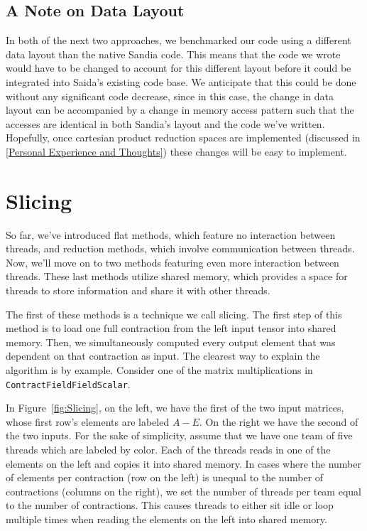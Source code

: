 
\subsection{A Note on Data Layout}
In both of the next two approaches, we benchmarked our code using a different data layout than the native
Sandia code. This means that the code we wrote would have to be changed to account for this different layout
before it could be integrated into Saida's existing code base. We anticipate that this could be done without any
significant code decrease, since in this case, the change in data layout can be accompanied by a change in 
memory access pattern such that the accesses are identical in both Sandia's layout and the code we've written.
Hopefully, once cartesian product reduction spaces are implemented (discussed in \ref{Personal Experience and Thoughts}) these 
changes will be easy to implement. 
\section{Slicing} \label{slicing}
So far, we've introduced flat methods, which feature no interaction between threads, and reduction
methods, which involve communication between threads. Now, we'll move on to two methods
featuring even more interaction between threads. These last methods utilize shared memory, 
which provides a space for threads to store information and share it with other threads. 

The first of these methods is a technique we call slicing. The first
step of this method is to load one full contraction from the left input tensor into
shared memory. Then, we simultaneously computed every output element that was
dependent on that contraction as input. The clearest way to explain the
algorithm is by example. Consider one of the matrix multiplications in
\texttt{ContractFieldFieldScalar}. 

    In Figure~\ref{fig:Slicing}, on the left, we have the first of the two input matrices, whose first row's
elements are labeled $A-E$. On the right we have the second of the two inputs.
For the sake of simplicity, assume that we have one team of five threads which
are labeled by color. Each of the threads reads in one of the elements on the
left and copies it into shared memory. In cases where the number of elements
per contraction (row on the left) is unequal to the number of contractions
(columns on the right), we set the number of threads per team equal to the
number of contractions. This causes threads to either sit idle or loop multiple
times when reading the elements on the left into shared memory.
	
